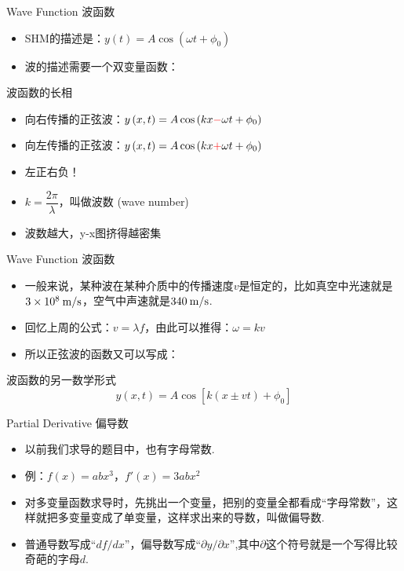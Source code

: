 \documentclass{beamer}
\begin{document}
\begin{frame}{Wave Function 波函数}
	\begin{itemize}
		\item SHM的描述是：$y\left(t\right) = A \cos \left(\omega t + \phi_0\right)$
		\item 波的描述需要一个双变量函数：
	\end{itemize}
	
	\begin{block}{波函数的长相}
	\begin{itemize}
		\item 向右传播的正弦波：$y\left(x, t\right) = A \cos \left(kx \textcolor{red}{-} \omega t + \phi_0\right)$
		\item 向左传播的正弦波：$y\left(x, t\right) = A \cos \left(kx \textcolor{red}{+} \omega t + \phi_0\right)$
		\item 左正右负！
	\end{itemize}
	\end{block}
	
	\begin{itemize}
		\item $k = \dfrac{2\pi}{\lambda}$，叫做波数 (wave number)
		\item 波数越大，y-x图挤得越密集
	\end{itemize}
\end{frame}

\begin{frame}{Wave Function 波函数}
	\begin{itemize}
		\item 一般来说，某种波在某种介质中的传播速度$v$是恒定的，比如真空中光速就是$3 \times 10^8\: {\rm m/s}$，空气中声速就是$340\: {\rm m/s}$.
		\item 回忆上周的公式：$v = \lambda f$，由此可以推得：$\omega = kv$
		\item 所以正弦波的函数又可以写成：
	\end{itemize}

	\begin{block}{波函数的另一数学形式}
		\[y\left(x, t\right) = A \cos \left[k\left(x \pm vt\right) + \phi_0\right]\]
	\end{block}
\end{frame}

\begin{frame}{Partial Derivative 偏导数}
	\begin{itemize}
		\item 以前我们求导的题目中，也有字母常数.
		\item 例：$f\left(x\right) = a b x^3$，$f'\left(x\right) = 3 ab x^2$
		\item 对多变量函数求导时，先挑出一个变量，把别的变量全都看成``字母常数''，这样就把多变量变成了单变量，这样求出来的导数，叫做偏导数.
		\item 普通导数写成``$df/dx$''，偏导数写成``$\partial y/\partial x$'',其中$\partial$这个符号就是一个写得比较奇葩的字母$d$.
	\end{itemize}
\end{frame}
\end{document}

